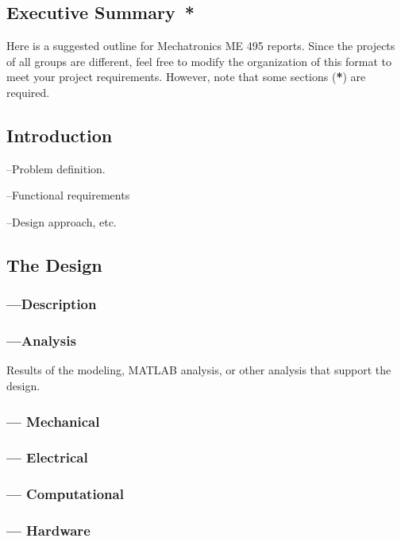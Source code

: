\documentclass[twocolumn]{article}
\begin{document}




\subsection*{Executive Summary{{\color{red}\ *}}}

Here is a suggested outline for Mechatronics ME 495 reports. Since the projects of all groups are different, feel free to modify the organization of this format to meet your project requirements. However, note that some sections ({\color{red}\bf{*}}) are required. 

\subsection*{Introduction}

\noindent --Problem definition.

\noindent --Functional requirements

\noindent --Design approach, etc.

\subsection*{The Design}

\subsubsection*{ ---Description}

\subsubsection*{ ---Analysis}
Results of the modeling, MATLAB analysis, or other analysis that support the design.
\subsubsection*{ --- Mechanical}
\subsubsection*{ --- Electrical}
\subsubsection*{ --- Computational}
\subsubsection*{ --- Hardware}
\end{document}
